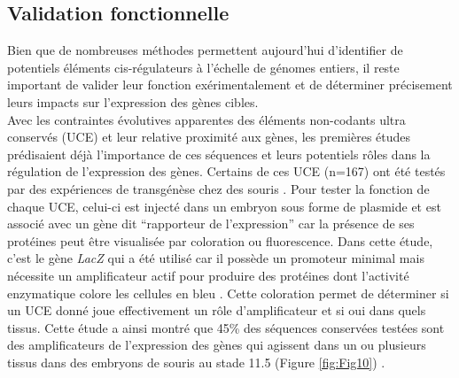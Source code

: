\subsection{Validation fonctionnelle}
\label{subsec:validation}

Bien que de nombreuses méthodes permettent aujourd’hui d’identifier de potentiels éléments \gls{cis}-régulateurs à l’échelle de génomes entiers, il reste important de valider leur fonction exérimentalement et de déterminer précisement leurs impacts sur l’expression des gènes cibles. \\

Avec les contraintes évolutives apparentes des éléments non-codants ultra conservés (UCE) et leur relative proximité aux gènes, les premières études prédisaient déjà l’importance de ces séquences et leurs potentiels rôles dans la régulation de l’expression des gènes. Certains de ces UCE (n=167) ont été testés par des expériences de transgénèse chez des souris \citep{pennacchio_vivo_2006}. Pour tester la fonction de chaque UCE, celui-ci est injecté dans un embryon sous forme de plasmide et est associé avec un gène dit “rapporteur de l’expression” car la présence de ses protéines peut être visualisée par coloration ou fluorescence. Dans cette étude, c’est le gène \textit{LacZ} qui a été utilisé car il possède un promoteur minimal mais nécessite un \gls{amplificateur} actif pour produire des protéines dont l’activité enzymatique colore les cellules en bleu \citep{li_overview_2018}. Cette coloration permet de déterminer si un UCE donné joue effectivement un rôle d’\gls{amplificateur} et si oui dans quels tissus. Cette étude a ainsi montré que 45\% des séquences conservées testées sont des \glspl{amplificateur} de l’expression des gènes qui agissent dans un ou plusieurs tissus dans des embryons de souris au stade 11.5 (Figure \ref{fig:Fig10}) \citep{pennacchio_vivo_2006}. \\



